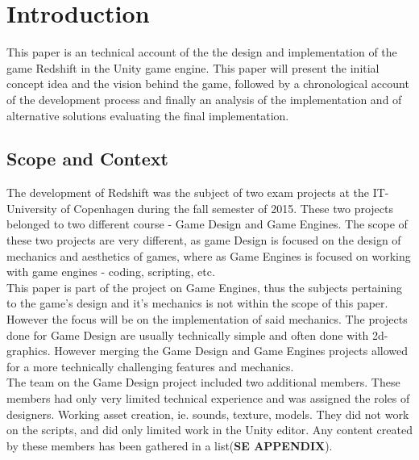 \section{Introduction}
 This paper is an technical account of the the design and implementation of the game Redshift in the Unity game engine. This paper will present the initial concept idea and the vision behind the game, followed by a chronological account of the development process and finally an analysis of the implementation and of alternative solutions evaluating the final implementation.
\subsection{Scope and Context}
The development of Redshift was the subject of two exam projects at the IT-University of Copenhagen during the fall semester of 2015.
These two projects belonged to two different course - Game Design and Game Engines.
The scope of these two projects are very different, as game Design is focused on the design of mechanics and aesthetics of games, where as Game Engines is focused on working with game engines - coding, scripting, etc.\\

This paper is part of the project on Game Engines, thus the subjects pertaining to the game's design and it's mechanics is not within the scope of this paper. However the focus will be on the implementation of said mechanics.
The projects done for Game Design are usually technically simple and often done with 2d-graphics. However merging the Game Design and Game Engines projects allowed for a more technically challenging features and mechanics.\\

The team on the Game Design project included two additional members. These members had only very limited technical experience and was assigned the roles of designers. Working asset creation, ie. sounds, texture, models. They did not work on the scripts, and did only limited work in the Unity editor. Any content created by these members has been gathered in a list(\textbf{SE APPENDIX}).



